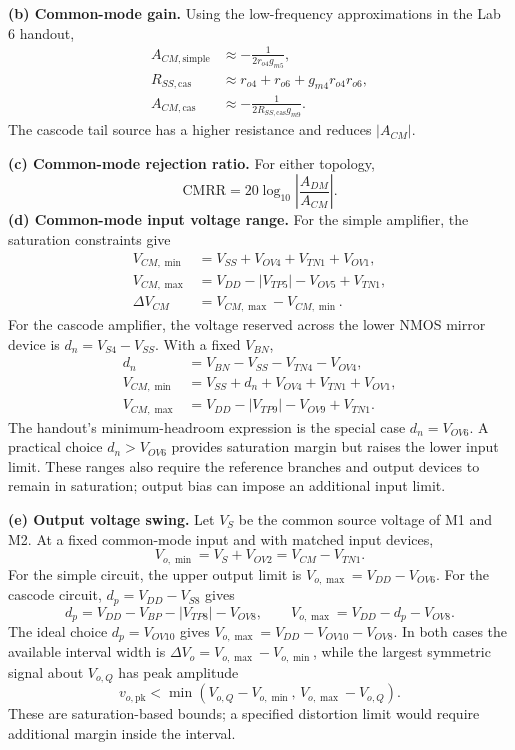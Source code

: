\documentclass[12pt,letterpaper]{article}
\begin{document}
\begin{enumerate}
\textbf{(b) Common-mode gain.}
Using the low-frequency approximations in the Lab 6 handout,
\begin{align*}
A_{CM,\mathrm{simple}}&\approx-\frac{1}{2r_{o4}g_{m5}},\\
R_{SS,\mathrm{cas}}&\approx r_{o4}+r_{o6}+g_{m4}r_{o4}r_{o6},\\
A_{CM,\mathrm{cas}}&\approx-\frac{1}{2R_{SS,\mathrm{cas}}g_{m9}}.
\end{align*}
The cascode tail source has a higher resistance and reduces $|A_{CM}|$.

\textbf{(c) Common-mode rejection ratio.}
For either topology,
\[
\boxed{\mathrm{CMRR}=20\log_{10}\!\left|\frac{A_{DM}}{A_{CM}}\right|.}
\]
\newpage
\textbf{(d) Common-mode input voltage range.}
For the simple amplifier, the saturation constraints give
\begin{align*}
V_{CM,\min}&=V_{SS}+V_{OV4}+V_{TN1}+V_{OV1},\\
V_{CM,\max}&=V_{DD}-|V_{TP5}|-V_{OV5}+V_{TN1},\\
\Delta V_{CM}&=V_{CM,\max}-V_{CM,\min}.
\end{align*}
For the cascode amplifier, the voltage reserved across
the lower NMOS mirror device is
$d_n=V_{S4}-V_{SS}$. With a fixed $V_{BN}$,
\begin{align*}
d_n&=V_{BN}-V_{SS}-V_{TN4}-V_{OV4},\\
V_{CM,\min}&=V_{SS}+d_n+V_{OV4}+V_{TN1}+V_{OV1},\\
V_{CM,\max}&=V_{DD}-|V_{TP9}|-V_{OV9}+V_{TN1}.
\end{align*}
The handout's minimum-headroom expression is the special case
$d_n=V_{OV6}$. A practical choice $d_n>V_{OV6}$ provides
saturation margin but raises the lower input limit. These ranges
also require the reference branches and output devices to remain
in saturation; output bias can impose an additional input limit.

\textbf{(e) Output voltage swing.}
Let $V_S$ be the common source voltage of M1 and M2. At a fixed
common-mode input and with matched input devices,
\[
V_{o,\min}=V_S+V_{OV2}=V_{CM}-V_{TN1}.
\]
For the simple circuit, the upper output limit is
$V_{o,\max}=V_{DD}-V_{OV6}$.
For the cascode circuit, $d_p=V_{DD}-V_{S8}$ gives
\[
d_p=V_{DD}-V_{BP}-|V_{TP8}|-V_{OV8},\qquad
V_{o,\max}=V_{DD}-d_p-V_{OV8}.
\]
The ideal choice $d_p=V_{OV10}$ gives
$V_{o,\max}=V_{DD}-V_{OV10}-V_{OV8}$.
In both cases the available interval width is
$\Delta V_o=V_{o,\max}-V_{o,\min}$, while the largest symmetric
signal about $V_{o,Q}$ has peak amplitude
\[
v_{o,\mathrm{pk}}<\min(V_{o,Q}-V_{o,\min},\,V_{o,\max}-V_{o,Q}).
\]
These are saturation-based bounds; a specified distortion limit
would require additional margin inside the interval.


\end{enumerate}
\end{document}
